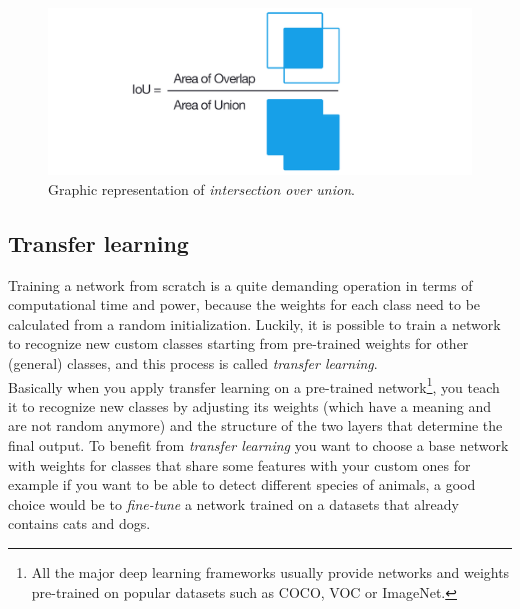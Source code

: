 \begin{figure}[htbp]
\begin{center}
\includegraphics[width=\textwidth]{immagini/pictures/iou_equation.png} 
\caption{Graphic representation of \emph{intersection over union}.}
\end{center}
\end{figure}
	
	\subsection{Transfer learning}
	Training a network from scratch is a quite demanding operation in terms of computational time and power, because the weights for each class need to be calculated from a random initialization. Luckily, it is possible to train a network to recognize new custom classes starting from pre-trained weights for other (general) classes, and this process is called \emph{transfer learning}. \\
	 Basically when you apply transfer learning on a pre-trained network\footnote{All the major deep learning frameworks usually provide networks and weights pre-trained on popular datasets such as COCO, VOC or ImageNet.}, you teach it to recognize new classes by adjusting its weights (which have a meaning and are not random anymore) and the structure of the two layers that determine the final output. To benefit from \emph{transfer learning}
	 you want to choose a base network with weights for classes that share some features with your custom ones for example if you want to be able to detect different species of animals, a good choice would be to \emph{fine-tune} a network trained on a datasets that already contains cats and dogs.
	
